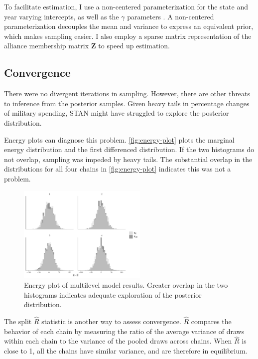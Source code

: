 \documentclass[12pt]{article}
\begin{document}
To facilitate estimation, I use a non-centered parameterization for the state and year varying intercepts, as well as the $\gamma$ parameters \citep{BetancourtGirolani2015}. 
A non-centered parameterization decouples the mean and variance to express an equivalent prior, which makes sampling easier. 
I also employ a sparse matrix representation of the alliance membership matrix $\textbf{Z}$ to speed up estimation. 


\subsection{Convergence} 


There were no divergent iterations in sampling. 
However, there are other threats to inference from the posterior samples. 
Given heavy tails in percentage changes of military spending, STAN might have struggled to explore the posterior distribution. 


Energy plots can diagnose this problem. 
\autoref{fig:energy-plot} plots the marginal energy distribution and the first differenced distribution. 
If the two histograms do not overlap, sampling was impeded by heavy tails. 
The substantial overlap in the distributions for all four chains in \autoref{fig:energy-plot} indicates this was not a problem. 


\begin{figure}
	\centering
		\includegraphics[width=0.55\textwidth]{energy-plot.pdf}
	\caption{Energy plot of multilevel model results. Greater overlap in the two histograms indicates adequate exploration of the posterior distribution. }
	\label{fig:energy-plot}
\end{figure}


The split $\hat{R}$ statistic is another way to assess convergence. 
$\hat{R}$ compares the behavior of each chain by measuring the ratio of the average variance of draws within each chain to the variance of the pooled draws across chains. 
When $\hat{R}$ is close to 1, all the chains have similar variance, and are therefore in equilibrium. 
\end{document}
